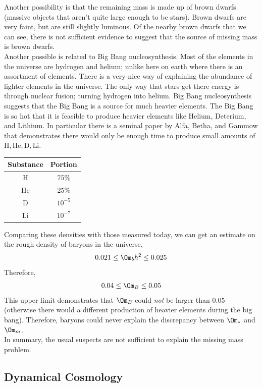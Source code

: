 \documentclass{article}
\begin{document}
Another possibility is that the remaining mass is made up of brown dwarfs (massive objects that aren't quite large enough to be stars). Brown dwarfs are very faint, but are still slightly luminous. Of the nearby brown dwarfs that we can see, there is not sufficient evidence to suggest that the source of missing mass is brown dwarfs.\\

Another possible is related to Big Bang nucleosynthesis. Most of the elements in the universe are hydrogen and helium; unlike here on earth where there is an assortment of elements. There is a very nice way of explaining the abundance of lighter elements in the universe. The only way that stars get there energy is through nuclear fusion; turning hydrogen into helium. Big Bang nucleosynthesis suggests that the Big Bang is a source for much heavier elements. The Big Bang is so hot that it is feasible to produce heavier elements like Helium, Deterium, and Lithium. In particular there is a seminal paper by Alfa, Betha, and Gammow that demonstrates there would only be enough time to produce small amounts of $\text{H}, \text{He}, \text{D}, \text{Li}$.
\begin{center}
    \begin{tabular}{|c|c|}
        \hline
        Substance & Portion \\
        \hline
        H & $75\%$\\
        He & $25\%$\\
        D & $10^{-5}$\\
        Li & $10^{-7}$\\
        \hline
    \end{tabular}
\end{center}
Comparing these densities with those measured today, we can get an estimate on the rough density of baryons in the universe,
\[ 0.021 \leq \Om_{b}h^2 \leq 0.025 \]
Therefore,
\[ 0.04 \leq \Om_B \leq 0.05 \]
This upper limit demonstrates that $\Om_B$ could \textit{not} be larger than $0.05$ (otherwise there would a different production of heavier elements during the big bang). Therefore, baryons could never explain the discrepancy between $\Om_{*}$ and $\Om_m$. \\

In summary, the usual suspects are not sufficient to explain the missing mass problem.

\subsection{Dynamical Cosmology}
\end{document}
